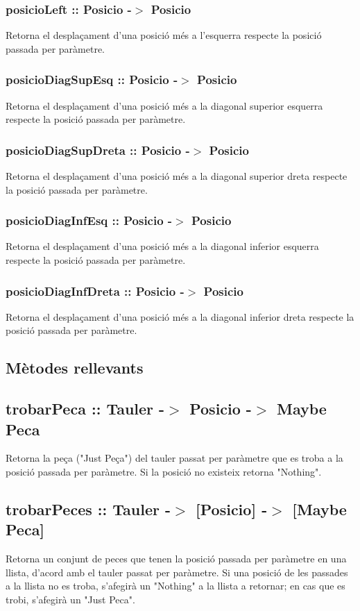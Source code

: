 \documentclass{article}
\begin{document}
\subsubsection*{posicioLeft :: Posicio -$>$ Posicio}
Retorna el desplaçament d'una posició més a l'esquerra respecte la posició passada per paràmetre.
\subsubsection*{posicioDiagSupEsq :: Posicio -$>$ Posicio}
Retorna el desplaçament d'una posició més a la diagonal superior esquerra respecte la posició passada per paràmetre.
\subsubsection*{posicioDiagSupDreta :: Posicio -$>$ Posicio}
Retorna el desplaçament d'una posició més a la diagonal superior dreta respecte la posició passada per paràmetre.
\subsubsection*{posicioDiagInfEsq :: Posicio -$>$ Posicio}
Retorna el desplaçament d'una posició més a la diagonal inferior esquerra respecte la posició passada per paràmetre.
\subsubsection*{posicioDiagInfDreta :: Posicio -$>$ Posicio}
Retorna el desplaçament d'una posició més a la diagonal inferior dreta respecte la posició passada per paràmetre.

\subsection{Mètodes rellevants}
\subsection*{trobarPeca :: Tauler -$>$ Posicio -$>$ Maybe Peca}
Retorna la peça ("Just Peça") del tauler passat per paràmetre
que es troba a la posició passada per paràmetre. Si la posició
no existeix retorna "Nothing".
\subsection*{trobarPeces :: Tauler -$>$ [Posicio] -$>$ [Maybe Peca]}
Retorna un conjunt de peces que tenen la posició passada per
paràmetre en una llista, d'acord amb el tauler passat per
paràmetre. Si una posició de les passades a la llista no es
troba, s'afegirà un "Nothing" a la llista a retornar; en cas
que es trobi, s'afegirà un "Just Peca".
\end{document}
